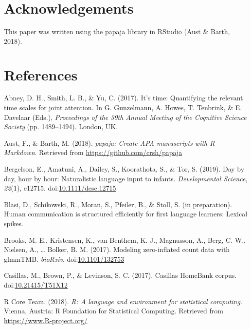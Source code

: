 \documentclass[,man,floatsintext]{apa6}
\begin{document}
\section{Acknowledgements}\label{acknowledgements}

This paper was written using the papaja library in RStudio (Aust \&
Barth, 2018).

\newpage

\section{References}\label{refs}

\begingroup
\setlength{\parindent}{-0.5in} \setlength{\leftskip}{0.5in}

\hypertarget{refs}{}
\hypertarget{ref-abney2017time}{}
Abney, D. H., Smith, L. B., \& Yu, C. (2017). It's time: Quantifying the
relevant time scales for joint attention. In G. Gunzelmann, A. Howes, T.
Tenbrink, \& E. Davelaar (Eds.), \emph{Proceedings of the 39th Annual
Meeting of the Cognitive Science Society} (pp. 1489--1494). London, UK.

\hypertarget{ref-R-papaja}{}
Aust, F., \& Barth, M. (2018). \emph{papaja: Create APA manuscripts with
R Markdown}. Retrieved from \url{https://github.com/crsh/papaja}

\hypertarget{ref-bergelson2019day}{}
Bergelson, E., Amatuni, A., Dailey, S., Koorathota, S., \& Tor, S.
(2019). Day by day, hour by hour: Naturalistic language input to
infants. \emph{Developmental Science}, \emph{22}(1), e12715.
doi:\href{https://doi.org/10.1111/desc.12715}{10.1111/desc.12715}

\hypertarget{ref-blasiIPhuman}{}
Blasi, D., Schikowski, R., Moran, S., Pfeiler, B., \& Stoll, S. (in
preparation). Human communication is structured efficiently for first
language learners: Lexical spikes.

\hypertarget{ref-brooks2017modeling}{}
Brooks, M. E., Kristensen, K., van Benthem, K. J., Magnusson, A., Berg,
C. W., Nielsen, A., \ldots{} Bolker, B. M. (2017). Modeling
zero-inflated count data with glmmTMB. \emph{bioRxiv}.
doi:\href{https://doi.org/10.1101/132753}{10.1101/132753}

\hypertarget{ref-Casillas-HB}{}
Casillas, M., Brown, P., \& Levinson, S. C. (2017). Casillas HomeBank
corpus. doi:\href{https://doi.org/10.21415/T51X12}{10.21415/T51X12}

\hypertarget{ref-R-base}{}
R Core Team. (2018). \emph{R: A language and environment for statistical
computing}. Vienna, Austria: R Foundation for Statistical Computing.
Retrieved from \url{https://www.R-project.org/}
\end{document}
